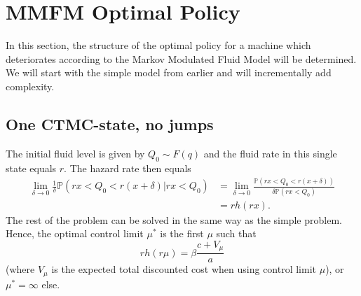 


\chapter{MMFM Optimal Policy}
In this section, the structure of the optimal policy for a machine which deteriorates according to the Markov Modulated Fluid Model will be determined.
We will start with the simple model from earlier and will incrementally add complexity.

\section{One CTMC-state, no jumps}
The initial fluid level is given by $Q_0\sim F(q)$ and the fluid rate in this single state equals $r$.
The hazard rate then equals
\begin{equation}
\begin{split}
\lim\limits_{\delta\rightarrow0}\frac{1}{\delta}\mathbb{P}(rx<Q_0<r(x+\delta)|rx<Q_0)&=\lim\limits_{\delta\rightarrow0}\frac{\mathbb{P}(rx<Q_0<r(x+\delta))}{\delta\mathbb{P}(rx<Q_0)}\\
&=rh(rx).
\end{split}
\end{equation}
The rest of the problem can be solved in the same way as the simple problem.
Hence, the optimal control limit $\mu^*$ is the first $\mu$ such that
\begin{equation}
rh(r\mu)=\beta\frac{c+V_\mu}{a}
\end{equation}
(where $V_\mu$ is the expected total discounted cost when using control limit $\mu$), or $\mu^*=\infty$ else.
